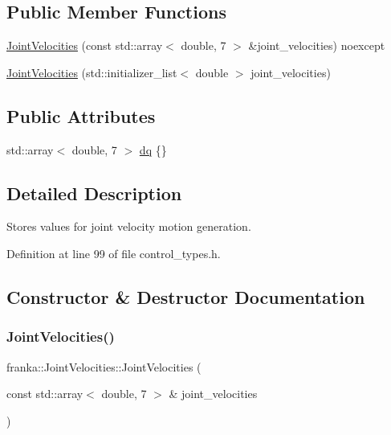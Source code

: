 \subsection*{Public Member Functions}
\begin{DoxyCompactItemize}
\item 
\hyperlink{classfranka_1_1JointVelocities_a1130f851055de3b7ebe9e6fbac960826}{Joint\+Velocities} (const std\+::array$<$ double, 7 $>$ \&joint\+\_\+velocities) noexcept
\item 
\hyperlink{classfranka_1_1JointVelocities_aed384fad8e302638c2e5baea6378c2d2}{Joint\+Velocities} (std\+::initializer\+\_\+list$<$ double $>$ joint\+\_\+velocities)
\end{DoxyCompactItemize}
\subsection*{Public Attributes}
\begin{DoxyCompactItemize}
\item 
std\+::array$<$ double, 7 $>$ \hyperlink{classfranka_1_1JointVelocities_a14fddb6fe7a7c4034dc82c283de8c2d3}{dq} \{\}
\end{DoxyCompactItemize}


\subsection{Detailed Description}
Stores values for joint velocity motion generation. 

Definition at line 99 of file control\+\_\+types.\+h.



\subsection{Constructor \& Destructor Documentation}
\mbox{\label{classfranka_1_1JointVelocities_a1130f851055de3b7ebe9e6fbac960826}} 
\subsubsection{\texorpdfstring{Joint\+Velocities()}{JointVelocities()}\hspace{0.1cm}{\footnotesize\ttfamily [1/2]}}
{\footnotesize\ttfamily franka\+::\+Joint\+Velocities\+::\+Joint\+Velocities (\begin{DoxyParamCaption}\item[{const std\+::array$<$ double, 7 $>$ \&}]{joint\+\_\+velocities }\end{DoxyParamCaption})\hspace{0.3cm}{\ttfamily [noexcept]}}

